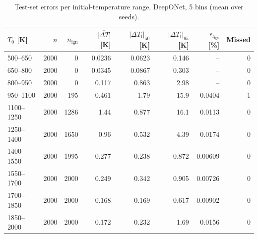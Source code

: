 \begin{table}[htbp]
    \centering
    \small
    \begin{tabular}{lrrrrrrr}
        \hline
        $T_0$ [K] & $n$ & $n_\mathrm{ign}$ & $\overline{|\Delta T|}$ [K] & $|\Delta T_\mathrm{f}|_{50}$ [K] & $|\Delta T_\mathrm{f}|_{95}$ [K] & $\epsilon_{t_\mathrm{ign}}$ [\%] & Missed \\
        \hline
        500--650 & 2000 & 0 & 0.0236 & 0.0623 & 0.146 & -- & 0 \\
        650--800 & 2000 & 0 & 0.0345 & 0.0867 & 0.303 & -- & 0 \\
        800--950 & 2000 & 0 & 0.117 & 0.863 & 2.98 & -- & 0 \\
        950--1100 & 2000 & 195 & 0.461 & 1.79 & 15.9 & 0.0404 & 1 \\
        1100--1250 & 2000 & 1286 & 1.44 & 0.877 & 16.1 & 0.0113 & 0 \\
        1250--1400 & 2000 & 1650 & 0.96 & 0.532 & 4.39 & 0.0174 & 0 \\
        1400--1550 & 2000 & 1995 & 0.277 & 0.238 & 0.872 & 0.00609 & 0 \\
        1550--1700 & 2000 & 2000 & 0.249 & 0.342 & 0.905 & 0.00726 & 0 \\
        1700--1850 & 2000 & 2000 & 0.168 & 0.169 & 0.617 & 0.00902 & 0 \\
        1850--2000 & 2000 & 2000 & 0.172 & 0.232 & 1.69 & 0.0156 & 0 \\
        \hline
    \end{tabular}
    \caption{Test-set errors per initial-temperature range, DeepONet, 5 bins (mean over seeds).}
    \label{tab:T0_deeponet_predicted_b5_conv}
\end{table}
